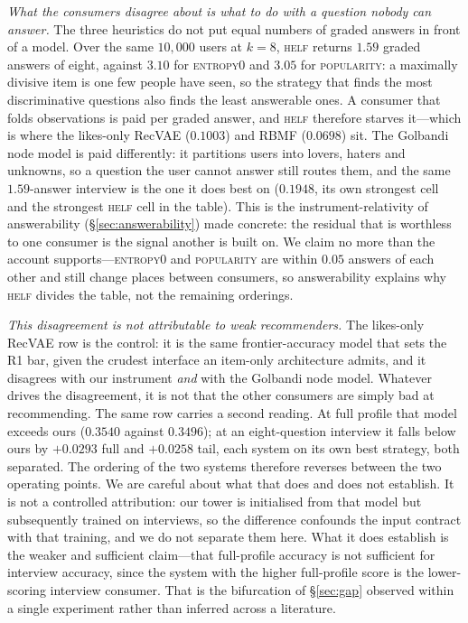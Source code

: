 \documentclass[11pt]{article}
\begin{document}
\emph{What the consumers disagree about is what to do with a question nobody can answer.} The three
heuristics do not put equal numbers of graded answers in front of a model. Over the same $10{,}000$ users
at $k{=}8$, \textsc{helf} returns $1.59$ graded answers of eight, against $3.10$ for \textsc{entropy0} and
$3.05$ for \textsc{popularity}: a maximally divisive item is one few people have seen, so the strategy that
finds the most discriminative questions also finds the least answerable ones. A consumer that folds
observations is paid per graded answer, and \textsc{helf} therefore starves it---which is where the
likes-only RecVAE ($0.1003$) and RBMF ($0.0698$) sit. The Golbandi node model is paid differently: it
partitions users into lovers, haters and unknowns, so a question the user cannot answer still routes them,
and the same $1.59$-answer interview is the one it does best on ($0.1948$, its own strongest cell and the
strongest \textsc{helf} cell in the table). This is the instrument-relativity of answerability
(\S\ref{sec:answerability}) made concrete: the residual that is worthless to one consumer is the signal
another is built on. We claim no more than the account supports---\textsc{entropy0} and \textsc{popularity}
are within $0.05$ answers of each other and still change places between consumers, so answerability
explains why \textsc{helf} divides the table, not the remaining orderings.

\emph{This disagreement is not attributable to weak recommenders.} The likes-only RecVAE row is the control: it is the same frontier-accuracy model that sets the R1 bar, given the crudest interface an
item-only architecture admits, and it disagrees with our instrument \emph{and} with the Golbandi node model.
Whatever drives the disagreement, it is not that the other consumers are simply bad at recommending. The same row
carries a second reading. At full profile that model exceeds ours ($0.3540$ against $0.3496$); at an
eight-question interview it falls below ours by $+0.0293$ full and $+0.0258$ tail, each system on its own best
strategy, both separated. The ordering of the two systems therefore reverses between the two operating points.
We are careful about what that does and does not establish. It is not a controlled attribution: our tower is
initialised from that model but subsequently trained on interviews, so the difference confounds the input
contract with that training, and we do not separate them here. What it does establish is the weaker and
sufficient claim---that full-profile accuracy is not sufficient for interview accuracy, since the system with
the higher full-profile score is the lower-scoring interview consumer. That is the bifurcation of
\S\ref{sec:gap} observed within a single experiment rather than inferred across a literature.
\end{document}
